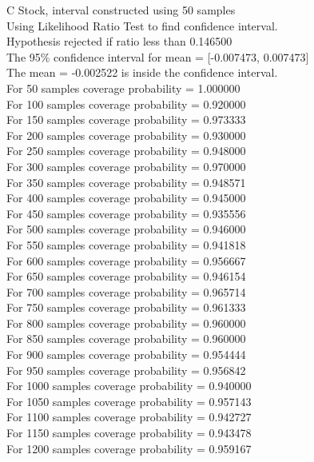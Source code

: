 \documentclass{article}
\begin{document}
C Stock, interval constructed using 50 samples\\
Using Likelihood Ratio Test to find confidence interval.\\
Hypothesis rejected if ratio less than 0.146500\\
The 95\% confidence interval for mean = [-0.007473, 0.007473]\\
The mean = -0.002522 is inside the confidence interval.\\
For 50 samples coverage probability = 1.000000\\
For 100 samples coverage probability = 0.920000\\
For 150 samples coverage probability = 0.973333\\
For 200 samples coverage probability = 0.930000\\
For 250 samples coverage probability = 0.948000\\
For 300 samples coverage probability = 0.970000\\
For 350 samples coverage probability = 0.948571\\
For 400 samples coverage probability = 0.945000\\
For 450 samples coverage probability = 0.935556\\
For 500 samples coverage probability = 0.946000\\
For 550 samples coverage probability = 0.941818\\
For 600 samples coverage probability = 0.956667\\
For 650 samples coverage probability = 0.946154\\
For 700 samples coverage probability = 0.965714\\
For 750 samples coverage probability = 0.961333\\
For 800 samples coverage probability = 0.960000\\
For 850 samples coverage probability = 0.960000\\
For 900 samples coverage probability = 0.954444\\
For 950 samples coverage probability = 0.956842\\
For 1000 samples coverage probability = 0.940000\\
For 1050 samples coverage probability = 0.957143\\
For 1100 samples coverage probability = 0.942727\\
For 1150 samples coverage probability = 0.943478\\
For 1200 samples coverage probability = 0.959167\\
\end{document}
